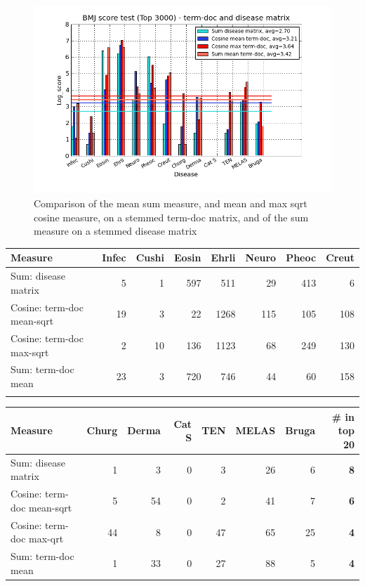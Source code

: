 \begin{figure}[H]
  \caption{Comparison of the mean sum measure, and mean and max sqrt cosine measure, on a stemmed term-doc matrix, and of the sum measure on a stemmed disease matrix}
  \begin{center}
    \includegraphics[width=1.2\textwidth]{barcharts/termDoc_bmj_hist_3000_sum_dm_mea_cos_sqrt_td_max_cos_sqrt_td_mea_sum_td.png}
  \end{center}
  \label{termDoc_bmj_hist_3000_sum_dm_mea_cos_sqrt_td_max_cos_sqrt_td_mea_sum_td}
\end{figure}

\begin{table}[H]
  \begin{tiny}
    \begin{tabular}{|l|r|r|r|r|r|r|r|}
      \hline
      Measure &Infec&Cushi&Eosin&Ehrli&Neuro&Pheoc&Creut \\
      \hline
      Sum: disease matrix &5&1&597&511&29&413&6 \\
      \hline
      Cosine: term-doc mean-sqrt &19&3&22&1268&115&105&108 \\
      \hline
      Cosine: term-doc max-sqrt &2&10&136&1123&68&249&130 \\
      \hline
      Sum: term-doc mean &23&3&720&746&44&60&158 \\
      \hline
      \multicolumn{8}{c}{} \\
    \end{tabular}
    \begin{tabular}{|l|r|r|r|r|r|r|r|}
      \hline
      Measure &Churg&Derma&Cat S&TEN&MELAS&Bruga& \scriptsize{\textbf{\# in top 20}} \\
      \hline
      Sum: disease matrix &1&3&0&3&26&6 &\scriptsize{\textbf{8}} \\
      \hline
      Cosine: term-doc mean-sqrt &5&54&0&2&41&7 &\scriptsize{\textbf{6}}\\
      \hline
      Cosine: term-doc max-qrt &44&8&0&47&65&25 & \scriptsize{\textbf{4}} \\
      \hline
      Sum: term-doc mean &1&33&0&27&88&5 & \scriptsize{\textbf{4}} \\
      \hline
    \end{tabular}
  \end{tiny}
\end{table}

